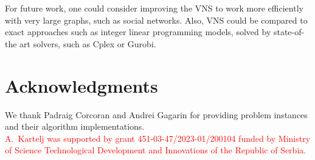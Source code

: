 \documentclass[dvipsnames,format=sigconf]{acmart} %
\begin{document}
 For future work, one could consider improving the VNS to work more efficiently with very large graphs, such as social networks. Also, VNS could be compared to exact approaches such as integer linear programming models, solved by state-of-the art solvers, such as Cplex or Gurobi. 
  
\section*{Acknowledgments} 
We thank Padraig Corcoran and Andrei Gagarin for providing problem instances and their algorithm implementations. \\
\textcolor{red}{A.~Kartelj was supported by grant 451-03-47/2023-01/200104 funded by Ministry of Science Technological Development and Innovations of the Republic of Serbia.}



 
\end{document}
